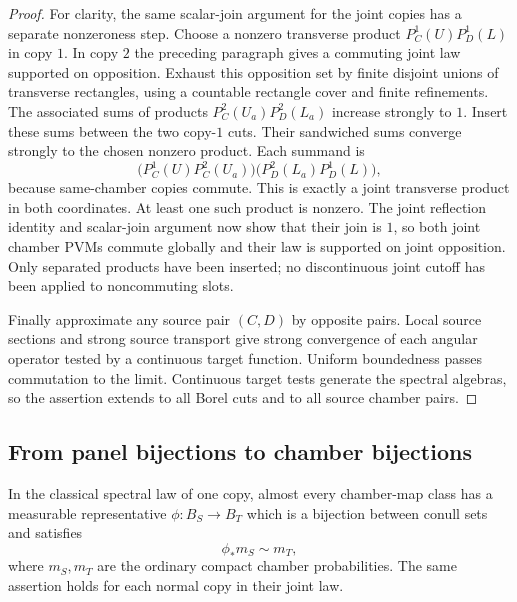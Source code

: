 \begin{proof}
For clarity, the same scalar-join argument for
the joint copies has a separate nonzeroness step.
Choose a nonzero transverse product
$P_C^1(U)P_D^1(L)$ in copy $1$.  In copy $2$
the preceding paragraph gives a commuting joint
law supported on opposition.  Exhaust this
opposition set by finite disjoint unions of
transverse rectangles, using a countable
rectangle cover and finite refinements.  The
associated sums of products
$P_C^2(U_a)P_D^2(L_a)$ increase strongly to $1$.
Insert these sums between the two copy-$1$
cuts.  Their sandwiched sums converge strongly
to the chosen nonzero product.  Each summand is
\[
 \bigl(P_C^1(U)P_C^2(U_a)\bigr)
 \bigl(P_D^2(L_a)P_D^1(L)\bigr),
\]
because same-chamber copies commute.  This is
exactly a joint transverse product in both
coordinates.  At least one such product is
nonzero.  The joint reflection identity and
scalar-join argument now show that their join
is $1$, so both joint chamber PVMs commute
globally and their law is supported on joint
opposition.  Only separated products have
been inserted; no discontinuous joint cutoff
has been applied to noncommuting slots.

Finally approximate any source pair $(C,D)$
by opposite pairs.  Local source sections and
strong source transport give strong convergence
of each angular operator tested by a continuous
target function.  Uniform boundedness passes
commutation to the limit.  Continuous target
tests generate the spectral algebras, so the
assertion extends to all Borel cuts and to
all source chamber pairs.
\end{proof}

\subsection{From panel bijections to chamber bijections}

\begin{proposition}
\label{prop:gluing-chamber-bijections}
In the classical spectral law of one copy, almost every
chamber-map class has a measurable representative
$\phi:B_S\to B_T$ which is a bijection between conull
sets and satisfies
\[
 \phi_*m_S\sim m_T,
\]
where $m_S,m_T$ are the ordinary compact chamber
probabilities.  The same assertion holds for each
normal copy in their joint law.
\end{proposition}

